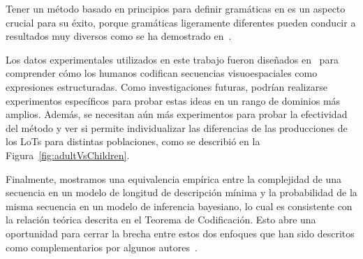 Tener un método basado en principios para definir gramáticas en \lot es un aspecto crucial para su éxito, porque gramáticas ligeramente diferentes pueden conducir a resultados muy diversos como se ha demostrado en~\cite{piantadosi2016logical}.


Los datos experimentales utilizados en este trabajo fueron diseñados en~\cite{amalric2017language} para comprender cómo los humanos codifican secuencias visuoespaciales como expresiones estructuradas. Como investigaciones futuras, podrían realizarse experimentos específicos para probar estas ideas en un rango de dominios más amplios. Además, se necesitan aún más experimentos para probar la efectividad del método y ver si permite individualizar las diferencias de las producciones de los LoTs para distintas poblaciones, como se describió en la Figura~\ref{fig:adultVsChildren}.


Finalmente, mostramos una equivalencia empírica entre la complejidad de una secuencia en un modelo de longitud de descripción mínima y la probabilidad de la misma secuencia en un modelo de inferencia bayesiano, lo cual es consistente con la relación teórica descrita en el Teorema de Codificación. Esto abre una oportunidad para cerrar la brecha entre estos dos enfoques que han sido descritos como complementarios por algunos autores~\cite{mackay2003information}.

